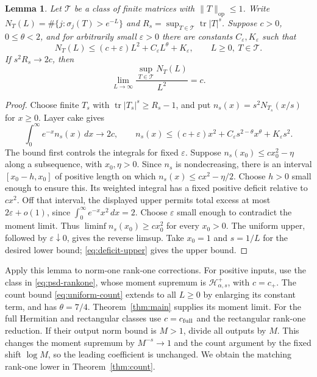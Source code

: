 \documentclass[11pt]{article}
\newtheorem{lemma}[theorem]{Lemma}
\numberwithin{equation}{section}
\newcommand{\tr}{\operatorname{tr}}
\newcommand{\op}{\mathrm{op}}
\newcommand{\cH}{\mathcal H}
\begin{document}
\begin{lemma}\label{lem:deficit}
Let $\mathcal T$ be a class of finite matrices with $\|T\|_\op\le1$.
Write $N_T(L)=\#\{j:\sigma_j(T)>e^{-L}\}$ and
$R_s=\sup_{T\in\mathcal T}\tr|T|^s$.
Suppose $c>0$, $0\le\theta<2$, and for arbitrarily small $\varepsilon>0$
there are constants $C_\varepsilon,K_\varepsilon$ such that
\begin{equation}\label{eq:deficit-upper}
 N_T(L)\le(c+\varepsilon)L^2
       +C_\varepsilon L^\theta+K_\varepsilon,
       \qquad L\ge0,\ T\in\mathcal T.
\end{equation}
If $s^2R_s\to2c$, then
\[
 \lim_{L\to\infty}\frac{\sup_{T\in\mathcal T}N_T(L)}{L^2}=c.
\]
\end{lemma}
\begin{proof}
Choose finite $T_s$ with $\tr|T_s|^s\ge R_s-1$, and put
$n_s(x)=s^2N_{T_s}(x/s)$ for $x\ge0$. Layer cake gives
\[
 \int_0^\infty e^{-x}n_s(x)\,dx\longrightarrow2c,
 \qquad
 n_s(x)\le(c+\varepsilon)x^2
       +C_\varepsilon s^{2-\theta}x^\theta
       +K_\varepsilon s^2.
\]
The bound first controls the integrals for fixed $\varepsilon$.
Suppose $n_s(x_0)\le cx_0^2-\eta$ along a subsequence, with $x_0,\eta>0$.
Since $n_s$ is nondecreasing, there is an interval
$[x_0-h,x_0]$ of positive length on which
$n_s(x)\le cx^2-\eta/2$. Choose $h>0$ small enough to ensure this.
Its weighted integral has a fixed positive deficit relative to $cx^2$.
Off that interval, the displayed upper permits total excess at most
$2\varepsilon+o(1)$, since $\int_0^\infty e^{-x}x^2\,dx=2$.
Choose $\varepsilon$ small enough to contradict the moment limit.
Thus $\liminf n_s(x_0)\ge cx_0^2$ for every $x_0>0$.
The uniform upper, followed by $\varepsilon\downarrow0$, gives the
reverse limsup. Take $x_0=1$ and $s=1/L$ for the desired lower bound;
\eqref{eq:deficit-upper} gives the upper bound.
\end{proof}

Apply this lemma to norm-one rank-one corrections. For positive inputs,
use the class in \eqref{eq:psd-rankone}, whose moment supremum is
$\cH^+_{\alpha,s}$, with $c=c_+$. The count bound
\eqref{eq:uniform-count} extends to all $L\ge0$ by enlarging its constant
term, and has $\theta=7/4$. Theorem~\ref{thm:main} supplies its moment
limit. For the full Hermitian and rectangular classes use $c=c_{\rm full}$
and the rectangular rank-one reduction. If their output norm bound is
$M>1$, divide all outputs by $M$. This changes the moment supremum by
$M^{-s}\to1$ and the count argument by the fixed shift $\log M$, so the
leading coefficient is unchanged. We obtain the matching rank-one lower
in Theorem~\ref{thm:count}.
\end{document}

